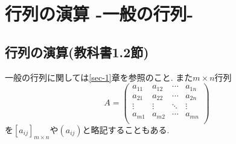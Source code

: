\documentclass[dvipdfmx,a4paper,11pt]{article}
\theoremstyle{definition}
\begin{document}
 
\newpage

\section{行列の演算 -一般の行列-}

\subsection{行列の演算(教科書1.2節)}
一般の行列に関しては\ref{sec-1}章を参照のこと.
また$m \times n$行列
$$
A=\begin{pmatrix}
a_{11}& a_{12} & \cdots &a_{1n} \\
a_{21}& a_{22} & \cdots &a_{2n} \\
\vdots& \vdots	&	\ddots   &	\vdots \\
a_{m1}& a_{m2} & \cdots &a_{mn} \\
\end{pmatrix}
$$
を$[a_{ij}]_{m\times n}$や$(a_{ij})$と略記することもある.
\end{document}
